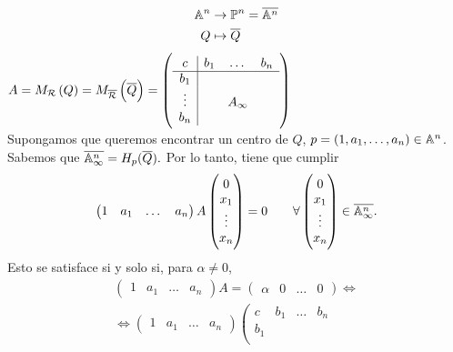 \begin{obs}
  \begin{align*}
    \mathbb{A}^n &\to \mathbb{P}^n = \overline{\mathbb{A}^n} \\
    Q &\mapsto \overline{Q}
  \end{align*}
  $A = M_{\mathcal{R}} \left( Q \right) = M_{\overline{\mathcal{R}}} \left( \overline{Q} \right) =
  \left(\begin{array}{c|ccc}
    c & b_1 & \dots & b_n \\
    \hline
    b_1 & & & \\
    \vdots & & A_\infty & \\
    b_n & & &
  \end{array}\right)$ \\
  Supongamos que queremos encontrar un centro de $Q$, $p = 
  \left( 1, a_1, \dots, a_n \right)\in \mathbb{A}^n$. Sabemos que $\overline{\mathbb{A}^n_\infty} = 
  H_p(\overline{Q}).$ Por lo tanto, tiene que cumplir
  \[\begin{pmatrix}
      1 & a_1 & \dots & a_n 
    \end{pmatrix}
    A
    \begin{pmatrix}
      0 \\ x_1 \\ \vdots \\ x_n 
    \end{pmatrix}
    = 0 \qquad \forall
    \begin{pmatrix} 0 \\ x_1 \\ \vdots \\ x_n \end{pmatrix} \in \overline{\mathbb{A}^n_\infty}.
  \]
  Esto se satisface si y solo si, para $\alpha \neq 0$,
  \begin{gather*}
    \begin{pmatrix}
      1 & a_1 & \dots & a_n 
    \end{pmatrix}
    A = 
    \begin{pmatrix} 
      \alpha & 0 & \dots & 0 
    \end{pmatrix} 
    \iff \\
    \iff
    \begin{pmatrix}
      1 & a_1 & \dots & a_n 
    \end{pmatrix}
    \left(\begin{array}{c|ccc}
      c & b_1 & \dots & b_n \\
      \hline
      b_1 & & & \\

\end{array}
\end{gather*}
\end{obs}
